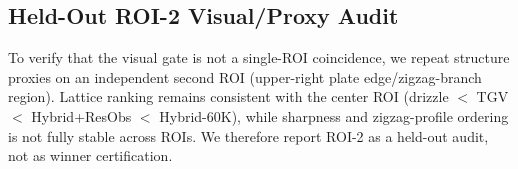 \subsection{Held-Out ROI-2 Visual/Proxy Audit}

To verify that the visual gate is not a single-ROI coincidence, we repeat
structure proxies on an independent second ROI (upper-right plate
edge/zigzag-branch region). Lattice ranking remains consistent with the center
ROI (drizzle $<$ TGV $<$ Hybrid+ResObs $<$ Hybrid-60K), while sharpness and
zigzag-profile ordering is not fully stable across ROIs. We therefore report
ROI-2 as a held-out audit, not as winner certification.

